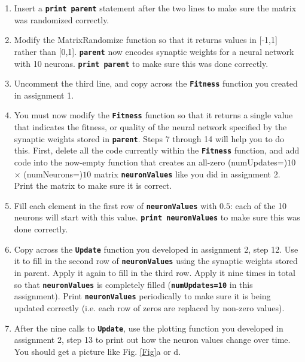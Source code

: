 \documentclass[12pt]{article}
\begin{document}
\begin{enumerate}
\item Insert a \textbf{\texttt{print parent}} statement after the two lines to make sure the matrix was randomized correctly.

\item Modify the MatrixRandomize function so that it returns values in [-1,1] rather than [0,1]. \textbf{\texttt{parent}} now encodes synaptic weights for a neural network with 10 neurons. \textbf{\texttt{print parent}} to make sure this was done correctly.

\item Uncomment the third line, and copy across the \textbf{\texttt{Fitness}} function you created in assignment 1.

\item You must now modify the \textbf{\texttt{Fitness}} function so that it returns a single value that indicates the fitness, or quality of the neural network specified by the synaptic weights stored in \textbf{\texttt{parent}}. Steps 7 through 14 will help you to do this. First, delete all the code currently within the \textbf{\texttt{Fitness}} function, and add code into the now-empty function that creates an all-zero (numUpdates=)$10$ $\times$ (numNeurons=)$10$ matrix \textbf{\texttt{neuronValues}} like you did in assignment 2. Print the matrix to make sure it is correct.

\item Fill each element in the first row of \textbf{\texttt{neuronValues}} with $0.5$: each of the 10 neurons will start with this value. \textbf{\texttt{print neuronValues}} to make sure this was done correctly.

\item Copy across the \textbf{\texttt{Update}} function you developed in assignment 2, step 12. Use it to fill in the second row of \textbf{\texttt{neuronValues}} using the synaptic weights stored in parent. Apply it again to fill in the third row. Apply it nine times in total so that \textbf{\texttt{neuronValues}} is completely filled (\textbf{\texttt{numUpdates=10}} in this assignment). Print \textbf{\texttt{neuronValues}} periodically to make sure it is being updated correctly (i.e. each row of zeros are replaced by non-zero values).

\item After the nine calls to \textbf{\texttt{Update}}, use the plotting function you developed in assignment 2, step 13 to print out how the neuron values change over time. You should get a picture like Fig. \ref{Fig}a or d.


\end{enumerate}
\end{document}
